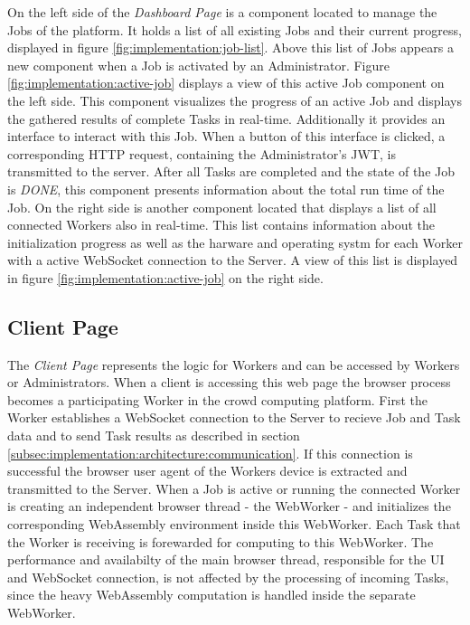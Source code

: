 On the left side of the \emph{Dashboard Page} is a component located to manage the Jobs of the platform. It holds a list of all existing Jobs and their current progress, displayed in figure \ref{fig:implementation:job-list}. Above this list of Jobs appears a new component when a Job is activated by an Administrator. Figure \ref{fig:implementation:active-job} displays a view of this active Job component on the left side. This component visualizes the progress of an active Job and displays the gathered results of complete Tasks in real-time. Additionally it provides an interface to interact with this Job. When a button of this interface is clicked, a corresponding \acs{HTTP} request, containing the Administrator's \ac{JWT}, is transmitted to the server. After all Tasks are completed and the state of the Job is \emph{DONE}, this component presents information about the total run time of the Job. On the right side is another component located that displays a list of all connected Workers also in real-time. This list contains information about the initialization progress as well as the harware and operating systm for each Worker with a active WebSocket connection to the Server. A view of this list is displayed in figure \ref{fig:implementation:active-job} on the right side.

\subsection{Client Page}
\label{subsec:implementation:client-page}

The \emph{Client Page} represents the logic for Workers and can be accessed by Workers or Administrators. When a client is accessing this web page the browser process becomes a participating Worker in the crowd computing platform. First the Worker establishes a WebSocket connection to the Server to recieve Job and Task data and to send Task results as described in section \ref{subsec:implementation:architecture:communication}. If this connection is successful the browser user agent of the Workers device is extracted and transmitted to the Server. When a Job is active or running the connected Worker is creating an independent browser thread - the WebWorker - and initializes the corresponding WebAssembly environment inside this WebWorker. Each Task that the Worker is receiving is forewarded for computing to this WebWorker. The performance and availabilty of the main browser thread, responsible for the \ac{UI} and WebSocket connection, is not affected by the processing of incoming Tasks, since the heavy WebAssembly computation is handled inside the separate WebWorker.

